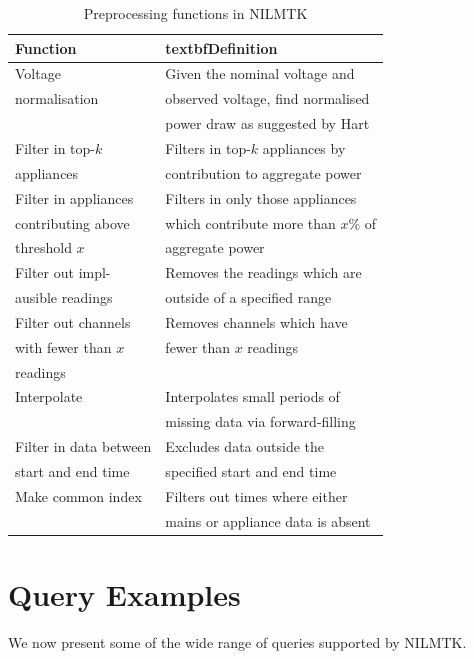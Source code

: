 \documentclass{sig-alternate}
\begin{document}
\begin{table}
    \small
    \begin{tabular}{ll}
    \hline
    \textbf{Function} & textbf{Definition} \\ \hline
    Voltage               & Given the nominal voltage and\\
    normalisation         &  observed voltage, find normalised\\
                          & power draw as suggested by Hart \\ \hline
    Filter in top-$k$     &Filters in top-$k$ appliances by\\
    appliances            &contribution to aggregate power\\ \hline
    Filter in appliances  &Filters in  only those appliances \\
    contributing above    &which contribute more than $x$\% of\\
    threshold $x$         &aggregate power\\ \hline
    Filter out  impl-     &Removes the readings which are\\
    ausible readings      &outside of a specified range\\ \hline
    Filter out channels   &Removes channels which have \\
    with fewer than $x$   &fewer than $x$ readings \\
    readings              &\\ \hline
    Interpolate           &Interpolates small periods of\\
                          &missing data via forward-filling\\ \hline
    Filter in data between& Excludes data outside the \\
    start and end time    & specified start and end time\\ \hline
    Make common index     &Filters out times where either\\
                          &mains or appliance data is absent\\ \hline
                                                          
    \end{tabular}
    \caption{Preprocessing functions in NILMTK}
  \label{tab:preprocessing_functions}
\end{table}
\section{Query Examples}
\label{app:examples}
We now present some of the wide range of queries supported by NILMTK.
\end{document}
